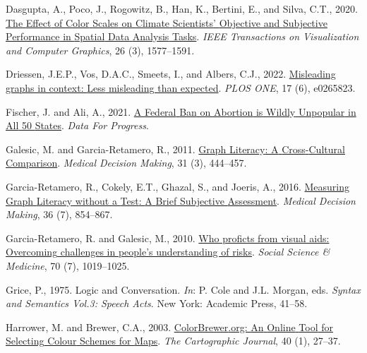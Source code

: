 \documentclass[
]{interact}
\newlength{\cslhangindent}
\newlength{\cslentryspacingunit} %
\newenvironment{CSLReferences}[2] %
 {%
  \setlength{\parindent}{0pt}
  \ifodd #1
  \let\oldpar\par
  \def\par{\hangindent=\cslhangindent\oldpar}
  \fi
  \setlength{\parskip}{#2\cslentryspacingunit}
 }%
 {}
\begin{document}
\begin{CSLReferences}{1}{0}
\leavevmode{}%
Dasgupta, A., Poco, J., Rogowitz, B., Han, K., Bertini, E., and Silva,
C.T., 2020. \href{https://doi.org/10.1109/TVCG.2018.2876539}{The
{Effect} of {Color} {Scales} on {Climate} {Scientists}' {Objective} and
{Subjective} {Performance} in {Spatial} {Data} {Analysis} {Tasks}}.
\emph{IEEE Transactions on Visualization and Computer Graphics}, 26 (3),
1577--1591.

\leavevmode{}%
Driessen, J.E.P., Vos, D.A.C., Smeets, I., and Albers, C.J., 2022.
\href{https://doi.org/10.1371/journal.pone.0265823}{Misleading graphs in
context: {Less} misleading than expected}. \emph{PLOS ONE}, 17 (6),
e0265823.

\leavevmode{}%
Fischer, J. and Ali, A., 2021.
\href{https://www.dataforprogress.org/blog/2021/12/10/a-federal-ban-on-abortion-is-wildly-unpopular-in-all-50-states}{A
{Federal} {Ban} on {Abortion} is {Wildly} {Unpopular} in {All} 50
{States}}. \emph{Data For Progress}.

\leavevmode{}%
Galesic, M. and Garcia-Retamero, R., 2011.
\href{https://doi.org/10.1177/0272989X10373805}{Graph {Literacy}: {A}
{Cross}-{Cultural} {Comparison}}. \emph{Medical Decision Making}, 31
(3), 444--457.

\leavevmode{}%
Garcia-Retamero, R., Cokely, E.T., Ghazal, S., and Joeris, A., 2016.
\href{https://doi.org/10.1177/0272989X16655334}{Measuring {Graph}
{Literacy} without a {Test}: {A} {Brief} {Subjective} {Assessment}}.
\emph{Medical Decision Making}, 36 (7), 854--867.

\leavevmode{}%
Garcia-Retamero, R. and Galesic, M., 2010.
\href{https://doi.org/10.1016/j.socscimed.2009.11.031}{Who proficts from
visual aids: {Overcoming} challenges in people's understanding of
risks}. \emph{Social Science \& Medicine}, 70 (7), 1019--1025.

\leavevmode{}%
Grice, P., 1975. Logic and {Conversation}. \emph{In}: P. Cole and J.L.
Morgan, eds. \emph{Syntax and {Semantics} {Vol}.3: {Speech} {Acts}}. New
York: Academic Press, 41--58.

\leavevmode{}%
Harrower, M. and Brewer, C.A., 2003.
\href{https://doi.org/10.1179/000870403235002042}{{ColorBrewer}.org:
{An} {Online} {Tool} for {Selecting} {Colour} {Schemes} for {Maps}}.
\emph{The Cartographic Journal}, 40 (1), 27--37.


\end{CSLReferences}
\end{document}
